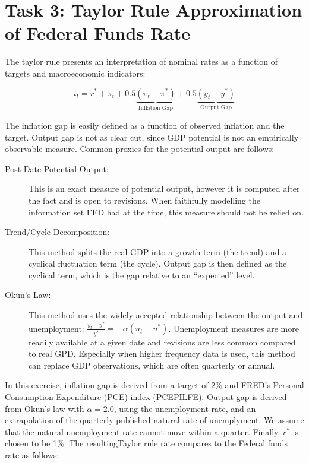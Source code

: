 \documentclass[11pt]{article}
\begin{document}
\section*{Task 3: Taylor Rule Approximation of Federal Funds Rate}

The taylor rule presents an interpretation of nominal rates as a function of targets and macroeconomic indicators:

\begin{equation}
    i_t = r^* + \pi_t +
    0.5\underbrace{(\pi_t - \pi^*)}_{\text{Inflation Gap}} +
    0.5\underbrace{(y_t - y^*)}_{\text{Output Gap}}
\end{equation}

\vspace{\baselineskip}

The inflation gap is easily defined as a function of observed inflation and the target.
Output gap is not as clear cut, since GDP potential is not an empirically observable measure.
Common proxies for the potential output are follows:

\begin{description}
    \item[Post-Date Potential Output:] This is an exact measure of potential output, however it is computed after the fact and is open to revisions.
          When faithfully modelling the information set FED had at the time, this measure should not be relied on.
    \item[Trend/Cycle Decomposition:] This method splits the real GDP into a growth term (the trend) and a cyclical fluctuation term (the cycle).
          Output gap is then defined as the cyclical term, which is the gap relative to an \enquote{expected} level.
    \item[Okun's Law:] This method uses the widely accepted relationship between the output and unemployment: $\frac{y_t - y^*}{y^*} = -\alpha(u_t - u^*)$.
          Unemployment measures are more readily available at a given date and revisions are less common compared to real GPD.
          Especially when higher frequency data is used, this method can replace GDP observations, which are often quarterly or annual.
\end{description}

In this exercise, inflation gap is derived from a target of 2\% and FRED's Personal Consumption Expenditure (PCE) index (PCEPILFE).
Output gap is derived from Okun's law with $\alpha=2.0$, using the unemployment rate, and an extrapolation of the quarterly published natural rate of unemplyment.
We assume that the natural unemployment rate cannot move within a quarter.
Finally, $r^*$ is chosen to be 1\%.
The resultingTaylor rule rate compares to the Federal funds rate as follows:
\end{document}
